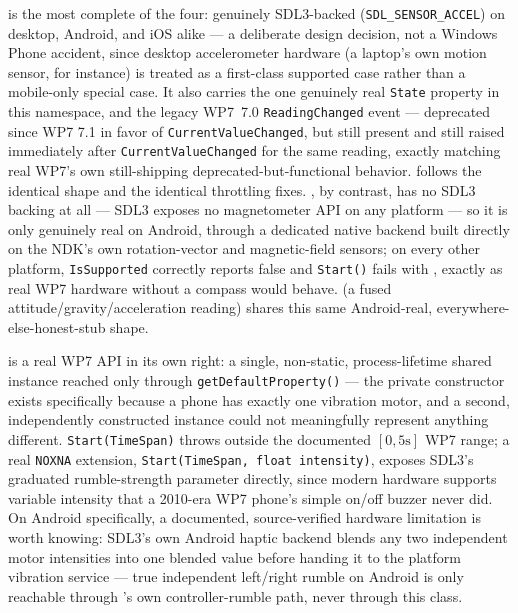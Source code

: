  is the most complete of the four: genuinely SDL3-backed
(\texttt{SDL\_SENSOR\_ACCEL}) on desktop, Android, and iOS alike --- a deliberate design
decision, not a Windows Phone accident, since desktop accelerometer hardware (a laptop's own
motion sensor, for instance) is treated as a first-class supported case rather than a
mobile-only special case. It also carries the one genuinely real \texttt{State} property in
this namespace, and the legacy WP7~7.0 \texttt{ReadingChanged} event --- deprecated since WP7
7.1 in favor of \texttt{CurrentValueChanged}, but still present and still raised immediately
after \texttt{CurrentValueChanged} for the same reading, exactly matching real WP7's own
still-shipping deprecated-but-functional behavior.  follows the identical
shape and the identical throttling fixes. , by contrast, has no SDL3
backing at all --- SDL3 exposes no magnetometer API on any platform --- so it is only
genuinely real on Android, through a dedicated native backend built directly on the NDK's own
rotation-vector and magnetic-field sensors; on every other platform, \texttt{IsSupported}
correctly reports false and \texttt{Start()} fails with ,
exactly as real WP7 hardware without a compass would behave.  (a fused
attitude/gravity/acceleration reading) shares this same Android-real,
everywhere-else-honest-stub shape.

 is a real WP7 API in its own right: a single, non-static,
process-lifetime shared instance reached only through \texttt{getDefaultProperty()} --- the
private constructor exists specifically because a phone has exactly one vibration motor, and
a second, independently constructed instance could not meaningfully represent anything
different. \texttt{Start(TimeSpan)} throws outside the documented $[0, 5\text{s}]$ WP7 range;
a real \texttt{NOXNA} extension, \texttt{Start(TimeSpan, float intensity)}, exposes SDL3's
graduated rumble-strength parameter directly, since modern hardware supports variable
intensity that a 2010-era WP7 phone's simple on/off buzzer never did. On Android specifically,
a documented, source-verified hardware limitation is worth knowing: SDL3's own Android haptic
backend blends any two independent motor intensities into one blended value before handing it
to the platform vibration service --- true independent left/right rumble on Android is only
reachable through 's own controller-rumble path, never through this class.

